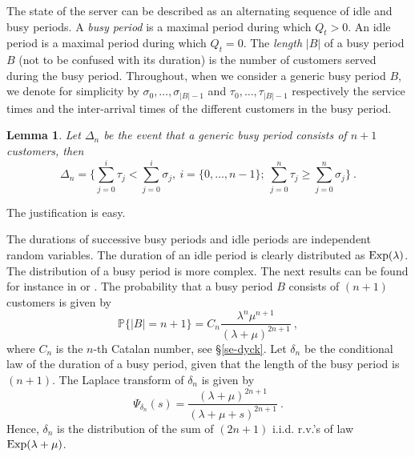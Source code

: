 \documentclass[11pt,a4paper]{article}
\numberwithin{equation}{section}
\newtheorem{lem}[prop]{Lemma}
\newcommand{\mrm}[1]{\text{\rm #1}}
\newcommand{\1}{\mathbbm{1}}
\newcommand{\p}{\mathbb{P}}
\begin{document}
The state of the server can be described as an alternating sequence of
idle and busy periods. A {\em busy period}
is a maximal period during which $Q_t>0$. An idle period is a maximal
period during which $Q_t=0$.
The {\em length} $|B|$ of a busy period $B$ (not to be confused with its
duration) is the number of customers served during the busy period.
Throughout, when we consider a generic busy period $B$, we denote for
simplicity by $\sigma_0, \dots, \sigma_{|B|-1}$ and $\tau_0, \dots,
\tau_{|B|-1}$ respectively the service times and the inter-arrival
times of the different customers in the busy period.

\begin{lem}\label{le-easy}
Let $\Delta_n$ be  the event that a generic busy period consists
of $n+1$ customers, then
\begin{equation}
\Delta_n =\{\sum_{j=0}^i \tau_j < \sum_{j=0}^i \sigma_j,\:
i=\{0,\dots,n-1\};\:\sum_{j=0}^n \tau_j  \geq \sum_{j=0}^n
\sigma_j\}\:.
\end{equation}
\end{lem}
\noindent
The justification is easy.

The durations of successive busy periods and idle
periods are independent random variables.
The duration of an idle period is clearly distributed as
$\mrm{Exp}(\lambda)$. The distribution of a busy period is more
complex. The next results can be found for instance in \cite[Chapter
II.2.2]{cohe82} or \cite[Chapter 1.2]{taka}.
The probability that a busy period $B$
consists of $(n+1)$ customers is given by
\begin{equation}\label{eq-length}
\p\{|B|=n+1\} = C_{n}
\frac{\lambda^{n}\mu^{n+1}}{(\lambda+\mu)^{2n+1}}\:,
\end{equation}
where $C_n$ is the $n$-th Catalan number, see \S \ref{se-dyck}.
Let $\delta_n$ be the conditional law of the duration of a busy period, given that the length
of the busy
period is $(n+1)$.
The Laplace
transform of $\delta_n$ is given by
\begin{equation}\label{duration-B}
\Psi_{\delta_n}(s) =\frac{(\lambda+\mu)^{2n+1}}{(\lambda+\mu+s)^{2n+1}}\:.
\end{equation}
Hence, $\delta_n$ is the distribution of the sum of $(2n+1)$ i.i.d. r.v.'s of law
$\mrm{Exp}(\lambda+\mu)$.

\medskip
\end{document}
